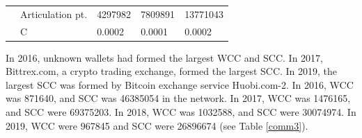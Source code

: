 \documentclass[preprint,12pt]{elsarticle}
\begin{document}
\begin{table}[H]
{\begin{tabular}{|l|l|l|l|l|}
              \\ \cline{2-5} 
                         \cline{2-5} 
                           & Articulation pt.     &    4297982           &  7809891             & 13771043              \\
                                  \cline{2-5} 
                              & C                    &    0.0002           &   0.0001            & 0.0002                \\ \hline
\end{tabular}}
\end{table}

In 2016, unknown wallets had formed the largest WCC and SCC. In 2017, Bittrex.com, a crypto trading exchange, formed the largest SCC. In 2019, the largest SCC was formed by Bitcoin exchange service Huobi.com-2. In 2016, WCC was 871640, and SCC was 46385054 in the network. In 2017, WCC was 1476165, and SCC were 69375203. In 2018, WCC was 1032588, and SCC were 30074974. In 2019, WCC were 967845 and SCC were 26896674 (see Table \ref{comm3}).
\end{document}

